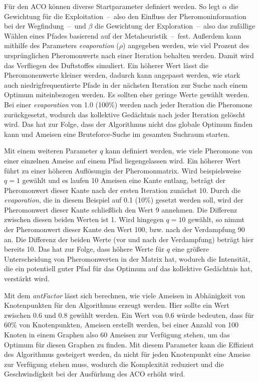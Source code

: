 Für den ACO können diverse Startparameter definiert werden. 
So legt $\alpha$ die Gewichtung für die Exploitation~--~also den Einfluss der
Pheromoninformation bei der Wegfindung~--~und $\beta$ die Gewichtung der
Exploration~--~also das zufällige Wählen eines Pfades basierend auf der
Metaheuristik~--~fest. Außerdem kann mithilfe des Parameters
\emph{evaporation} ($\rho$) angegeben werden, wie viel Prozent
des ursprünglichen Pheromonwerts nach einer Iteration behalten werden. Damit
wird das Verfliegen des Duftstoffes simuliert. Ein höherer Wert lässt die
Pheromonenwerte kleiner werden, dadurch kann angepasst werden, wie stark
auch niedrigfrequentierte Pfade in der nächsten Iteration zur Suche nach einem
Optimum miteinbezogen werden. Es sollten eher geringe Werte gewählt werden.
Bei einer \emph{evaporation} von 1.0 (100\%) werden nach jeder Iteration die
Pheromone zurückgesetzt, wodurch das kollektive Gedächtnis nach jeder Iteration
gelöscht wird. Das hat zur Folge, dass der Algorithmus nicht das globale
Optimum finden kann und Ameisen eine Bruteforce-Suche im gesamten Suchraum
starten.

Mit einem weiteren Parameter $q$ kann definiert werden, wie viele
Pheromone von einer einzelnen Ameise auf einem Pfad liegengelassen wird. Ein
höherer Wert führt zu einer höheren \glqq Auflösung\grqq in der Pheromonmatrix.
Wird beispielsweise $q=1$ gewählt und es laufen 10 Ameisen eine Kante entlang,
beträgt der Pheromonwert dieser Kante nach der ersten Iteration zunächst 10.
Durch die \emph{evaporation}, die in diesem Beispiel auf 0.1 (10\%) gesetzt
werden soll, wird der Pheromonwert dieser Kante schließlich den Wert 9
annehmen. Die Differenz zwischen diesen beiden Werten ist 1.
Wird hingegen $q=10$ gewählt, so nimmt der Pheromonwert dieser Kante den
Wert 100, bzw. nach der Verdampfung 90 an. Die Differenz der beiden Werte
(vor und nach der Verdampfung) beträgt hier bereits 10.
Das hat zur Folge, dass höhere Werte für $q$ eine größere Unterscheidung von
Pheromonwerten in der Matrix hat, wodurch die Intensität, die ein potentiell
guter Pfad für das Optimum auf das kollektive Gedächtnis hat, verstärkt wird.

Mit dem \emph{antFactor} lässt sich berechnen, wie viele Ameisen in Abhänigkeit
von Knotenpunkten für den Algorithmus erzeugt werden. Hier sollte ein Wert
zwischen 0.6 und 0.8 gewählt werden. Ein Wert von 0.6 würde bedeuten, dass für
60\% von Knotenpunkten, Ameisen erstellt werden, bei einer Anzahl von 100
Knoten in einem Graphen also 60 Ameisen zur Verfügung stehen, um das Optimum
für diesen Graphen zu finden. Mit diesem Parameter kann die Effizient des
Algorithmus gesteigert werden, da nicht für jeden Knotenpunkt eine Ameise zur
Verfügung stehen muss, wodurch die Komplexität reduziert und die
Geschwindigkeit bei der Ausfürhung des ACO erhöht wird.

